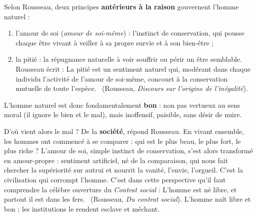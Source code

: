 \documentclass[11pt]{article}
\newcommand{\cle}[1]{{\popxbold\color{popdark}#1}}
\begin{document}
\begin{propriete}
Selon Rousseau, deux principes \textbf{antérieurs à la raison} gouvernent l'homme naturel :
\begin{enumerate}
\item l'\cle{amour de soi} (\emph{amour de soi-même}) : l'instinct de conservation, qui pousse chaque être vivant à veiller à sa propre survie et à son bien-être ;
\item la \cle{pitié} : la répugnance naturelle à voir souffrir ou périr un être semblable. Rousseau écrit : \guillemotleft La pitié est un sentiment naturel qui, modérant dans chaque individu l'activité de l'amour de soi-même, concourt à la conservation mutuelle de toute l'espèce. \guillemotright\ (Rousseau, \emph{Discours sur l'origine de l'inégalité}).
\end{enumerate}
L'homme naturel est donc fondamentalement \textbf{bon} : non pas vertueux au sens moral (il ignore le bien et le mal), mais inoffensif, paisible, sans désir de nuire.
\end{propriete}

D'où vient alors le mal ? De la \textbf{société}, répond Rousseau. En vivant ensemble, les hommes ont commencé à se comparer : qui est le plus beau, le plus fort, le plus riche ? L'amour de soi, simple instinct de conservation, s'est alors transformé en \cle{amour-propre} : sentiment artificiel, né de la comparaison, qui nous fait chercher la supériorité sur autrui et nourrit la vanité, l'envie, l'orgueil. C'est la civilisation qui corrompt l'homme. C'est dans cette perspective qu'il faut comprendre la célèbre ouverture du \emph{Contrat social} : \guillemotleft L'homme est né libre, et partout il est dans les fers. \guillemotright\ (Rousseau, \emph{Du contrat social}). L'homme naît libre et bon ; les institutions le rendent esclave et méchant.
\end{document}
